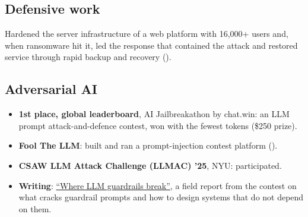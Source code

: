 \subsection{Defensive work}

Hardened the server infrastructure of a web platform with 16,000+ users and, when ransomware hit
it, led the response that contained the attack and restored service through rapid backup and
recovery ().

\subsection{Adversarial AI}

\begin{itemize}
  \item \textbf{1st place, global leaderboard}, AI Jailbreakathon by chat.win: an LLM prompt
        attack-and-defence contest, won with the fewest tokens (\$250 prize).
  \item \textbf{Fool The LLM}: built and ran a prompt-injection contest platform ().
  \item \textbf{CSAW LLM Attack Challenge (LLMAC) '25}, NYU: participated.
  \item \textbf{Writing}: \href{https://jkartik.in/blog/where-llm-guardrails-break/}{``Where LLM
        guardrails break''}, a field report from the contest on what cracks guardrail prompts and
        how to design systems that do not depend on them.
\end{itemize}
